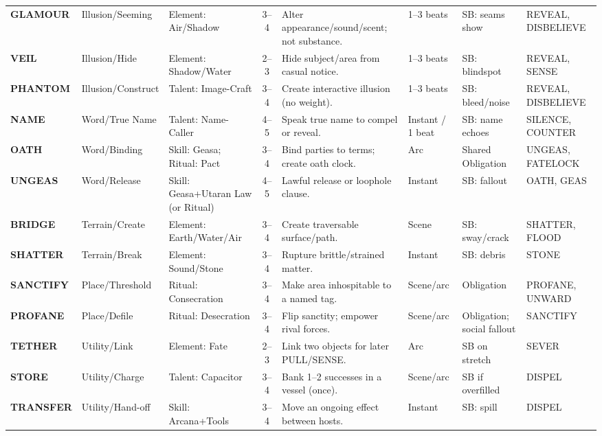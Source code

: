 \begin{longtable}{@{} l l p{4.2cm} c p{6.5cm} p{2.2cm} p{3.2cm} p{2.2cm} @{}}
\textbf{GLAMOUR}   & Illusion/Seeming  & Element: Air/Shadow                  & 3--4 & Alter appearance/sound/scent; not substance. & 1–3 beats & SB: seams show & REVEAL, DISBELIEVE \\
\textbf{VEIL}      & Illusion/Hide     & Element: Shadow/Water                & 2--3 & Hide subject/area from casual notice. & 1–3 beats & SB: blindspot & REVEAL, SENSE \\
\textbf{PHANTOM}   & Illusion/Construct& Talent: Image-Craft                  & 3--4 & Create interactive illusion (no weight). & 1–3 beats & SB: bleed/noise & REVEAL, DISBELIEVE \\

\textbf{NAME}      & Word/True Name    & Talent: Name-Caller                  & 4--5 & Speak true name to compel or reveal. & Instant / 1 beat & SB: name echoes & SILENCE, COUNTER \\
\textbf{OATH}      & Word/Binding      & Skill: Geasa; Ritual: Pact           & 3--4 & Bind parties to terms; create oath clock. & Arc & Shared Obligation & UNGEAS, FATELOCK \\
\textbf{UNGEAS}    & Word/Release      & Skill: Geasa+Utaran Law (or Ritual)  & 4--5 & Lawful release or loophole clause. & Instant & SB: fallout & OATH, GEAS \\

\textbf{BRIDGE}    & Terrain/Create    & Element: Earth/Water/Air             & 3--4 & Create traversable surface/path. & Scene & SB: sway/crack & SHATTER, FLOOD \\
\textbf{SHATTER}   & Terrain/Break     & Element: Sound/Stone                 & 3--4 & Rupture brittle/strained matter. & Instant & SB: debris & STONE \\
\textbf{SANCTIFY}  & Place/Threshold   & Ritual: Consecration                 & 3--4 & Make area inhospitable to a named tag. & Scene/arc & Obligation & PROFANE, UNWARD \\
\textbf{PROFANE}   & Place/Defile      & Ritual: Desecration                  & 3--4 & Flip sanctity; empower rival forces. & Scene/arc & Obligation; social fallout & SANCTIFY \\

\textbf{TETHER}    & Utility/Link      & Element: Fate                        & 2--3 & Link two objects for later PULL/SENSE. & Arc & SB on stretch & SEVER \\
\textbf{STORE}     & Utility/Charge    & Talent: Capacitor                    & 3--4 & Bank 1–2 successes in a vessel (once). & Scene/arc & SB if overfilled & DISPEL \\
\textbf{TRANSFER}  & Utility/Hand-off  & Skill: Arcana+Tools                  & 3--4 & Move an ongoing effect between hosts. & Instant & SB: spill & DISPEL \\

\end{longtable}
\normalsize

